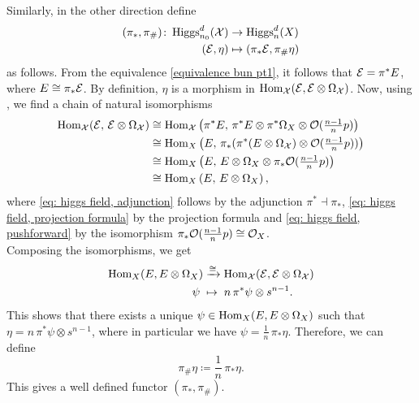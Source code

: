 Similarly, in the other direction define
\begin{align}
	(\pi_*, \pi_{\#}) \colon \operatorname{Higgs}_{n_0}^d(\mathcal{X})  &\to \operatorname{Higgs}_n^d(X)\\
	(\mathcal{E}, \eta) &\mapsto (\pi_*\mathcal{E}, \pi_{\#}\eta)
\end{align}
as follows.
From the equivalence \eqref{equivalence bun pt1}, it follows that $\mathcal{E} = \pi^*E$, where $E \cong \pi_* \mathcal{E}$. By definition, $\eta$ is a morphism in $\operatorname{Hom}_{\mathcal{X}}(\mathcal{E}, \mathcal{E}\otimes\Omega_{\mathcal{X}})$. Now, using , we find a chain of natural isomorphisms
\begin{align}
\operatorname{Hom}_{\mathcal{X}}(\mathcal{E}, \, \mathcal{E}\otimes\Omega_{\mathcal{X}}) & \cong \operatorname{Hom}_{\mathcal{X}}\left( \pi^*E, \, \pi^*E \otimes \pi^*\Omega_X \otimes \mathcal{O}(\tfrac{n-1}{n}p) \right)\\
& \cong \operatorname{Hom}_X\left( E, \, \pi_*(\pi^*(E \otimes \Omega_{\mathcal{X}}) \otimes \mathcal{O}(\tfrac{n-1}{n}p)) \right) \label{eq: higgs field, adjunction} \\
& \cong \operatorname{Hom}_X\left( E, \, E \otimes \Omega_X \otimes \pi_*\mathcal{O}(\tfrac{n-1}{n}p) \right) \label{eq: higgs field, projection formula} \\
& \cong \operatorname{Hom}_X\left( E, \, E \otimes \Omega_X \right), \label{eq: higgs field, pushforward}
\end{align}
where \eqref{eq: higgs field, adjunction} follows by the adjunction $\pi^* \dashv \pi_*$, \eqref{eq: higgs field, projection formula} by the projection formula and \eqref{eq: higgs field, pushforward} by the isomorphism $\pi_* \mathcal{O}(\tfrac{n-1}{n}p) \cong \mathcal{O}_X$. \\
Composing the isomorphisms, we get
\begin{align}
	\operatorname{Hom}_X(E, E \otimes \Omega_X) &\xrightarrow{\cong} \operatorname{Hom}_{\mathcal{X}}(\mathcal{E}, \mathcal{E}\otimes \Omega_{\mathcal{X}}) \\
	\psi \; &\mapsto \; n \, \pi^* \psi \otimes s^{n-1}.
\end{align}
This shows that there exists a unique $\psi \in \operatorname{Hom}_X(E, E \otimes \Omega_X)$ such that $\eta = n \, \pi^* \psi \otimes s^{n-1}$, where in particular we have $\psi = \frac{1}{n} \, \pi_* \eta$. Therefore, we can define
\[
\pi_{\#}\eta \coloneqq \frac{1}{n} \, \pi_* \eta.
\]
This gives a well defined functor $(\pi_*, \pi_{\#})$.


